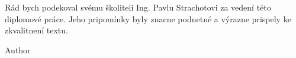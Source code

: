 \documentclass[a4paper,12pt]{report}	%
\begin{document}
\vspace{5mm} %

Rád bych podekoval svému školiteli Ing. Pavlu Strachotovi za vedení této diplomové práce. Jeho pripomínky byly znacne podnetné a výrazne prispely ke zkvalitnení textu.

\begin{flushright}
Author
\end{flushright}


















\nocite{*}				%

\end{document}
